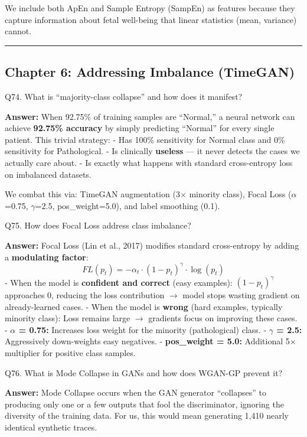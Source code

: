 \documentclass[11pt,a4paper]{article}
\begin{document}
We include both ApEn and Sample Entropy (SampEn) as features because
they capture information about fetal well-being that linear statistics
(mean, variance) cannot.

\begin{center}\rule{0.5\linewidth}{0.5pt}\end{center}

\subsection{Chapter 6: Addressing Imbalance
(TimeGAN)}\label{chapter-6-addressing-imbalance-timegan}

\begin{questionbox}
Q74. What is ``majority-class collapse'' and how does it
manifest?
\end{questionbox}
\textbf{Answer:} When 92.75\% of training samples are ``Normal,'' a neural
network can achieve \textbf{92.75\% accuracy} by simply predicting
``Normal'' for every single patient. This trivial strategy: - Has 100\%
sensitivity for Normal class and 0\% sensitivity for Pathological. - Is
clinically \textbf{useless} --- it never detects the cases we actually
care about. - Is exactly what happens with standard cross-entropy loss
on imbalanced datasets.

We combat this via: TimeGAN augmentation (3$\times$ minority class), Focal Loss
($\alpha$=0.75, $\gamma$=2.5, pos\_weight=5.0), and label smoothing (0.1).

\begin{questionbox}
Q75. How does Focal Loss address class imbalance?
\end{questionbox}
\textbf{Answer:} Focal Loss (Lin et al., 2017) modifies standard
cross-entropy by adding a \textbf{modulating factor}:
\[FL(p_t) = -\alpha_t \cdot (1 - p_t)^\gamma \cdot \log(p_t)\] - When
the model is \textbf{confident and correct} (easy examples):
\((1-p_t)^\gamma\) approaches 0, reducing the loss contribution $\rightarrow$ model
stops wasting gradient on already-learned cases. - When the model is
\textbf{wrong} (hard examples, typically minority class): Loss remains
large $\rightarrow$ gradients focus on improving these cases. - \textbf{$\alpha$ = 0.75:}
Increases loss weight for the minority (pathological) class. - \textbf{$\gamma$
= 2.5:} Aggressively down-weights easy negatives. - \textbf{pos\_weight
= 5.0:} Additional 5$\times$ multiplier for positive class samples.

\begin{questionbox}
Q76. What is Mode Collapse in GANs and how does WGAN-GP prevent
it?
\end{questionbox}
\textbf{Answer:} Mode Collapse occurs when the GAN generator ``collapses'' to
producing only one or a few outputs that fool the discriminator,
ignoring the diversity of the training data. For us, this would mean
generating 1,410 nearly identical synthetic traces.
\end{document}
